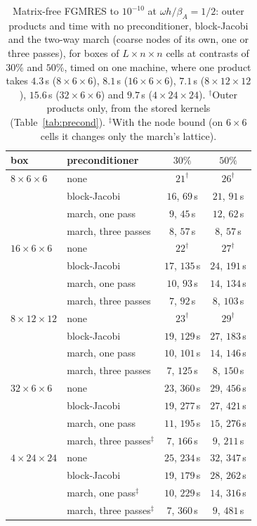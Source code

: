 \documentclass[11pt,a4paper]{article}
\begin{document}
\begin{table}[htbp]
\centering
\caption{Matrix-free FGMRES to $10^{-10}$ at $\omega h/\beta_A=1/2$: outer products and time with no
preconditioner, block-Jacobi and the two-way march (coarse nodes of its own, one or three passes), for boxes of
$L\times n\times n$ cells at contrasts of $30\%$ and $50\%$, timed on one machine, where one product takes $4.3$\,s ($8\times6\times6$),
$8.1$\,s ($16\times6\times6$), $7.1$\,s ($8\times12\times12$), $15.6$\,s ($32\times6\times6$) and $9.7$\,s ($4\times24\times24$).
$^\dagger$Outer products only, from the stored kernels (Table~\ref{tab:precond}). $^\ddagger$With the node bound
(on $6\times6$ cells it changes only the march's lattice).}
\label{tab:downup}
\begin{tabular}{llcc}
\toprule
box & preconditioner & $30\%$ & $50\%$ \\
\midrule
$8\times6\times6$ & none & $21^\dagger$ & $26^\dagger$ \\
 & block-Jacobi & $16$, $69$\,s & $21$, $91$\,s \\
 & march, one pass & $9$, $45$\,s & $12$, $62$\,s \\
 & march, three passes & $8$, $57$\,s & $8$, $57$\,s \\
$16\times6\times6$ & none & $22^\dagger$ & $27^\dagger$ \\
 & block-Jacobi & $17$, $135$\,s & $24$, $191$\,s \\
 & march, one pass & $10$, $93$\,s & $14$, $134$\,s \\
 & march, three passes & $7$, $92$\,s & $8$, $103$\,s \\
$8\times12\times12$ & none & $23^\dagger$ & $29^\dagger$ \\
 & block-Jacobi & $19$, $129$\,s & $27$, $183$\,s \\
 & march, one pass & $10$, $101$\,s & $14$, $146$\,s \\
 & march, three passes & $7$, $125$\,s & $8$, $150$\,s \\
$32\times6\times6$ & none & $23$, $360$\,s & $29$, $456$\,s \\
 & block-Jacobi & $19$, $277$\,s & $27$, $421$\,s \\
 & march, one pass & $11$, $195$\,s & $15$, $276$\,s \\
 & march, three passes$^\ddagger$ & $7$, $166$\,s & $9$, $211$\,s \\
$4\times24\times24$ & none & $25$, $234$\,s & $32$, $347$\,s \\
 & block-Jacobi & $19$, $179$\,s & $28$, $262$\,s \\
 & march, one pass$^\ddagger$ & $10$, $229$\,s & $14$, $316$\,s \\
 & march, three passes$^\ddagger$ & $7$, $360$\,s & $9$, $481$\,s \\
\bottomrule
\end{tabular}
\end{table}
\end{document}
